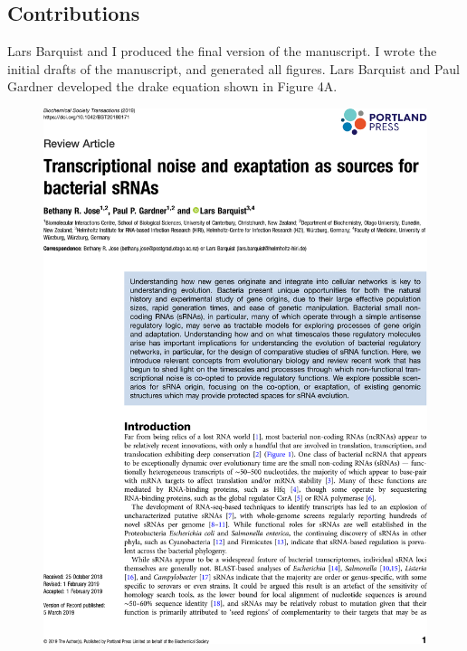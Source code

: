 \subsection{Contributions}
Lars Barquist and I produced the final version of the manuscript. I wrote the initial drafts of the manuscript, and generated all figures.  Lars Barquist and Paul Gardner developed the drake equation shown in Figure 4A.
\newpage
\begin{figure}
    \centering
    \includegraphics[width=\linewidth]{lit_review/page1.png}
\end{figure}
